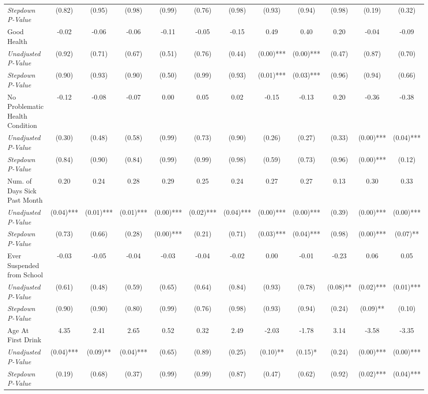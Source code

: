 \begin{tabular}{l c c c c c c c c c c c}
\quad \textit{Stepdown P-Value} & (0.82) & (0.95) & (0.98) & (0.99) & (0.76) & (0.98) & (0.93) & (0.94) & (0.98) & (0.19) & (0.32) \\
Good Health & -0.02 & -0.06 & -0.06 & -0.11 & -0.05 & -0.15 & 0.49 & 0.40 & 0.20 & -0.04 & -0.09 \\
\quad \textit{Unadjusted P-Value} & (0.92) & (0.71) & (0.67) & (0.51) & (0.76) & (0.44) & (0.00)*** & (0.00)*** & (0.47) & (0.87) & (0.70) \\
\quad \textit{Stepdown P-Value} & (0.90) & (0.93) & (0.90) & (0.50) & (0.99) & (0.93) & (0.01)*** & (0.03)*** & (0.96) & (0.94) & (0.66) \\
No Problematic Health Condition & -0.12 & -0.08 & -0.07 & 0.00 & 0.05 & 0.02 & -0.15 & -0.13 & 0.20 & -0.36 & -0.38 \\
\quad \textit{Unadjusted P-Value} & (0.30) & (0.48) & (0.58) & (0.99) & (0.73) & (0.90) & (0.26) & (0.27) & (0.33) & (0.00)*** & (0.04)*** \\
\quad \textit{Stepdown P-Value} & (0.84) & (0.90) & (0.84) & (0.99) & (0.99) & (0.98) & (0.59) & (0.73) & (0.96) & (0.00)*** & (0.12) \\
Num. of Days Sick Past Month & 0.20 & 0.24 & 0.28 & 0.29 & 0.25 & 0.24 & 0.27 & 0.27 & 0.13 & 0.30 & 0.33 \\
\quad \textit{Unadjusted P-Value} & (0.04)*** & (0.01)*** & (0.01)*** & (0.00)*** & (0.02)*** & (0.04)*** & (0.00)*** & (0.00)*** & (0.39) & (0.00)*** & (0.00)*** \\
\quad \textit{Stepdown P-Value} & (0.73) & (0.66) & (0.28) & (0.00)*** & (0.21) & (0.71) & (0.03)*** & (0.04)*** & (0.98) & (0.00)*** & (0.07)** \\
Ever Suspended from School & -0.03 & -0.05 & -0.04 & -0.03 & -0.04 & -0.02 & 0.00 & -0.01 & -0.23 & 0.06 & 0.05 \\
\quad \textit{Unadjusted P-Value} & (0.61) & (0.48) & (0.59) & (0.65) & (0.64) & (0.84) & (0.93) & (0.78) & (0.08)** & (0.02)*** & (0.01)*** \\
\quad \textit{Stepdown P-Value} & (0.90) & (0.90) & (0.80) & (0.99) & (0.76) & (0.98) & (0.93) & (0.94) & (0.24) & (0.09)** & (0.10) \\
Age At First Drink & 4.35 & 2.41 & 2.65 & 0.52 & 0.32 & 2.49 & -2.03 & -1.78 & 3.14 & -3.58 & -3.35 \\
\quad \textit{Unadjusted P-Value} & (0.04)*** & (0.09)** & (0.04)*** & (0.65) & (0.89) & (0.25) & (0.10)** & (0.15)* & (0.24) & (0.00)*** & (0.00)*** \\
\quad \textit{Stepdown P-Value} & (0.19) & (0.68) & (0.37) & (0.99) & (0.99) & (0.87) & (0.47) & (0.62) & (0.92) & (0.02)*** & (0.04)*** \\
\bottomrule
\end{tabular}
